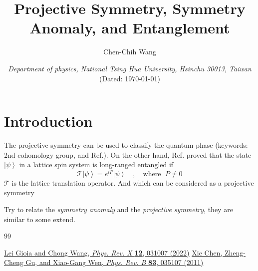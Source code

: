 \documentclass[12font]{article}
\title{\textbf{ Projective Symmetry, Symmetry Anomaly, and Entanglement }}
\author{Chen-Chih Wang  }
\date{\textit{Department of physics, National Tsing Hua University, Hsinchu 30013, Taiwan} \\ (Dated: \today)}
\newcommand{\ket}[1]{\left| #1 \right\rangle}
\newcommand{\alert}[1]{{\color{red}#1}}
\begin{document}
\maketitle



\begin{abstract}
  
\end{abstract}

\section{Introduction}
The projective symmetry can be used to classify the quantum phase (keywords: 2nd cohomology group, and Ref.\cite{MPS_gapped_phase}). On the other hand, Ref.\cite{Symmetry_and_Entanglement} proved that the state $\ket{\psi}$ in a lattice spin system is long-ranged entangled if 
\[\mathcal{T}\ket{\psi} = e^{iP}\ket{\psi}\quad,\quad\text{where }\;P\neq 0\]
$\mathcal{T}$ is the lattice translation operator. And which can be considered as a projective symmetry 

\alert{Try to relate the \emph{symmetry anomaly} and the \emph{projective symmetry}, they are similar to some extend.}



\begin{thebibliography}{99}

    \href{https://doi.org/10.1103/PhysRevX.12.031007}{Lei Gioia and Chong Wang, \emph{Phys. Rev. X} \textbf{12}, 031007 (2022)}
    \href{https://doi.org/10.1103/PhysRevB.83.035107}{Xie Chen, Zheng-Cheng Gu, and Xiao-Gang Wen, \emph{Phys. Rev. B} \textbf{83}, 035107 (2011)}

\end{thebibliography}
\end{document}
